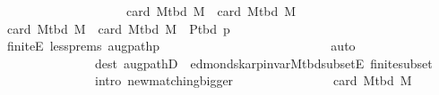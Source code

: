 \begin{isabellebody}
\ \ \ \ \ \ \ \ \isamarkupfalse%
\ {}\isanewline
\ \ \ \ \ \ \ \ \isamarkupfalse%
\ {\isachardoublequoteopen}card\ {\isacharparenleft}{\kern0pt}M{\isacharunderscore}{\kern0pt}tbd\ M{\isacharparenright}{\kern0pt}\ {\isacharless}{\kern0pt}\ card\ {\isacharparenleft}{\kern0pt}M{\isacharunderscore}{\kern0pt}tbd\ {\isacharquery}{\kern0pt}M{\isacharparenright}{\kern0pt}{\isachardoublequoteclose}%
\endisatagvisible
{\isafoldvisible}%
%
\isadelimvisible
\isanewline
%
\endisadelimvisible
%
\isadeliminvisible
\ \ \ \ \ \ \ \ %
\endisadeliminvisible
%
\isataginvisible
{}\isamarkupfalse%
\ {\isacharminus}{\kern0pt}\isanewline
\ \ \ \ \ \ \ \ \ \ \isamarkupfalse%
\ {\isachardoublequoteopen}card\ {\isacharparenleft}{\kern0pt}M{\isacharunderscore}{\kern0pt}tbd\ M{\isacharparenright}{\kern0pt}\ {\isacharless}{\kern0pt}\ card\ {\isacharparenleft}{\kern0pt}M{\isacharunderscore}{\kern0pt}tbd\ M\ {\isasymoplus}\ P{\isacharunderscore}{\kern0pt}tbd\ {\isacharquery}{\kern0pt}p{\isacharparenright}{\kern0pt}{\isachardoublequoteclose}\isanewline
\ \ \ \ \ \ \ \ \ \ \ \ \isamarkupfalse%
\ finite{\isacharunderscore}{\kern0pt}E\ less{\isachardot}{\kern0pt}prems\ augpath{\isacharunderscore}{\kern0pt}p\isanewline
\ \ \ \ \ \ \ \ \ \ \ \ \isamarkupfalse%
\isanewline
\ \ \ \ \ \ \ \ \ \ \ \ \ \ {\isacharparenleft}{\kern0pt}auto\isanewline
\ \ \ \ \ \ \ \ \ \ \ \ \ \ \ dest{\isacharcolon}{\kern0pt}\ augpathD{\isacharparenleft}{\kern0pt}{}{\isacharcomma}{\kern0pt}\ {}{\isacharparenright}{\kern0pt}\ edmonds{\isacharunderscore}{\kern0pt}karp{\isacharunderscore}{\kern0pt}invar{\isachardot}{\kern0pt}M{\isacharunderscore}{\kern0pt}tbd{\isacharunderscore}{\kern0pt}subset{\isacharunderscore}{\kern0pt}E\ finite{\isacharunderscore}{\kern0pt}subset\isanewline
\ \ \ \ \ \ \ \ \ \ \ \ \ \ \ intro{\isacharcolon}{\kern0pt}\ new{\isacharunderscore}{\kern0pt}matching{\isacharunderscore}{\kern0pt}bigger{\isacharparenright}{\kern0pt}\isanewline
\ \ \ \ \ \ \ \ \ \ \isamarkupfalse%
\ \isamarkupfalse%
\ {\isachardoublequoteopen}{\isachardot}{\kern0pt}{\isachardot}{\kern0pt}{\isachardot}{\kern0pt}\ {\isacharequal}{\kern0pt}\ card\ {\isacharparenleft}{\kern0pt}M{\isacharunderscore}{\kern0pt}tbd\ {\isacharquery}{\kern0pt}M{\isacharparenright}{\kern0pt}{\isachardoublequoteclose}\isanewline
\ \ \ \ \ \ \ \ \ \ \isamarkupfalse%
\ {\isacharminus}{\kern0pt}\isanewline
\ \ \ \ \ \ \ \ \ \ \ \ \isamarkupfalse%
\isanewline

\end{isabellebody}
